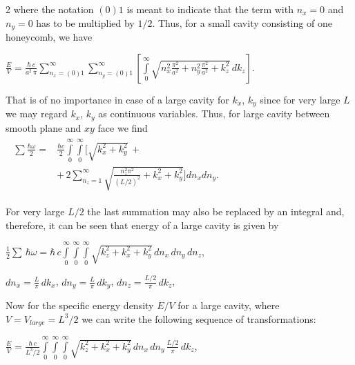 \documentclass[twoside, 10pt]{article}
\begin{document}
\begin{multicols}{2}
    where the notation \(\left(0\right) 1\) is meant to indicate that the
term with \(n_x = 0\) and \(n_y = 0\) has to be multiplied by
\(1\big/2\). Thus, for a small cavity consisting of one honeycomb, we have

    \(\frac{E}{V} = \frac{\hbar\,c}{a^2\,\pi}\sum\limits_{n_x=(0)1}^{\infty}\sum\limits_{n_y=(0)1}^{\infty}\left[\int\limits_{0}^{\infty}\sqrt{n_x^2\frac{\pi^2}{a^2}+n_y^2\frac{\pi^2}{a^2}+k_z^2}\,dk_z\right]\).

    That is of no importance in case of a large cavity for \(k_x\), \(k_y\)
since for very large \(L\) we may regard \(k_x\), \(k_y\) as
continuous variables. Thus, for large cavity between smooth plane and \(xy\) face we find
\noindent
\(\begin{array}{c}
\begin{array}{ll}
    \sum\frac{\hbar\omega}{2} = & \frac{\hbar c}{2}\int\limits_{0}^{\infty}\int\limits_{0}^{\infty}\Bigg[\sqrt{k_x^2+k_y^2}\,+ \\
   & +\,2\sum\limits_{n_z=1}^{\infty}\sqrt{\frac{n_z^2 \pi^2}{(L/2)^2}+k_x^2+k_y^2}\Bigg]d{n_x}d{n_y}.
\end{array}
\end{array}\)


    For very large \(L/2\) the last summation may also be replaced by an
integral and, therefore, it can be seen that energy of a large cavity is given by

    \(\frac{1}{2}\sum\,\hbar\omega = \hbar\,c\int\limits_{0}^{\infty}\int\limits_{0}^{\infty}\int\limits_{0}^{\infty}\sqrt{k_z^2+k_x^2+k_y^2}\,d{n_x}\,d{n_y}\,d{n_z}\),

    \(dn_x = \frac{L}{\pi}\,dk_x\), \(dn_y = \frac{L}{\pi}\,dk_y\),
\(dn_z = \frac{L/2}{\pi}\,dk_z\),

    Now for the specific energy density \(E/V\) for a large cavity, where
\(V = V_{large} = L^3/2\) we can write the following sequence of transformations:

\noindent
    \(\frac{E}{V} = \frac{\hbar\,c}{L^3/2}\int\limits_{0}^{\infty}\int\limits_{0}^{\infty}\int\limits_{0}^{\infty}\sqrt{k_z^2+k_x^2+k_y^2}\,dn_x\,dn_y\,\frac{L/2}{\pi}\,dk_z\),



\end{multicols}
\end{document}
